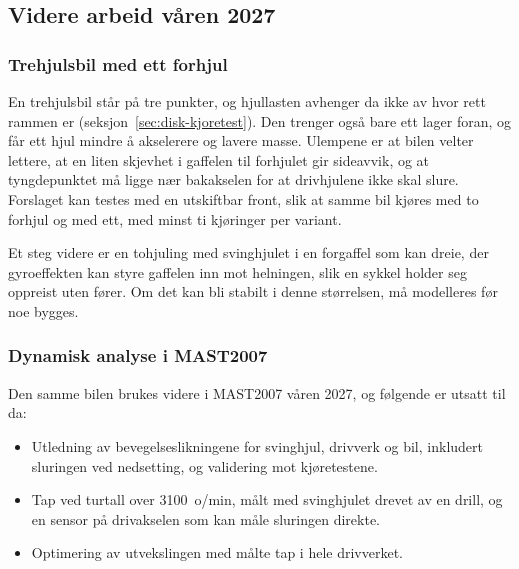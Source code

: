 \subsection{Videre arbeid våren 2027}

\subsubsection{Trehjulsbil med ett forhjul}
\label{sec:videre-trehjul}
En trehjulsbil står på tre punkter, og hjullasten avhenger da ikke av hvor rett rammen er (seksjon~\ref{sec:disk-kjoretest}). Den trenger også bare ett lager foran, og får ett hjul mindre å akselerere og lavere masse. Ulempene er at bilen velter lettere, at en liten skjevhet i gaffelen til forhjulet gir sideavvik, og at tyngdepunktet må ligge nær bakakselen for at drivhjulene ikke skal slure. Forslaget kan testes med en utskiftbar front, slik at samme bil kjøres med to forhjul og med ett, med minst ti kjøringer per variant.

Et steg videre er en tohjuling med svinghjulet i en forgaffel som kan dreie, der gyroeffekten kan styre gaffelen inn mot helningen, slik en sykkel holder seg oppreist uten fører. Om det kan bli stabilt i denne størrelsen, må modelleres før noe bygges.

\subsubsection{Dynamisk analyse i MAST2007}
Den samme bilen brukes videre i MAST2007 våren 2027, og følgende er utsatt til da:
\begin{itemize}
    \item Utledning av bevegelseslikningene for svinghjul, drivverk og bil, inkludert sluringen ved nedsetting, og validering mot kjøretestene.
    \item Tap ved turtall over \SI{3100}{o/min}, målt med svinghjulet drevet av en drill, og en sensor på drivakselen som kan måle sluringen direkte.
    \item Optimering av utvekslingen med målte tap i hele drivverket.
\end{itemize}
